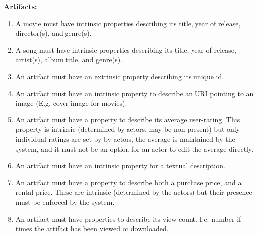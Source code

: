\textbf{Artifacts:}
\begin{enumerate}
\item A movie must have intrinsic properties describing its title, year of
	release, director(s), and genre(s).
\item A song must have intrinsic properties describing its title, year of
	release, artist(s), album title, and genre(s).
\item An artifact must have an extrinsic property describing its unique id.
\item An artifact must have an intrinsic property to describe an URI pointing to
	an image (E.g. cover image for movies).
\item An artifact must have a property to describe its average
	user-rating. This property is intrinsic (determined by actors, may be
	non-present) but only individual ratings are set by by actors, the
	average is maintained by the system, and it must not be an option for an
	actor to edit the average directly.
\item An artifact must have an intrinsic property for a textual description.
\item An artifact must have a property to describe both a purchase price, and a
	rental price. These are intrinsic (determined by the actors) but their
	presence must be enforced by the system.
\item An artifact must have properties to describe its view count. I.e. number
	if times the artifact has been viewed or downloaded.
\setcounter{enumTemp}{\theenumi}
\end{enumerate}

